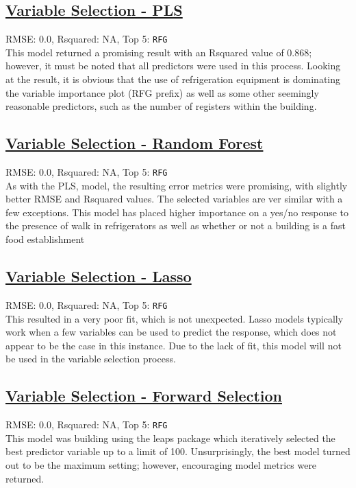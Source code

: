 \subsection{\hyperref[appendix:electricity:pls]{Variable Selection - PLS}}
RMSE: 0.0, Rsquared: NA, Top 5: \lstinline{RFG}
\\[0.0in]
\indent This model returned a promising result with an Rsquared value of 0.868; however, it must be noted that all predictors were used in this process.  Looking at the result, it is obvious that the use of refrigeration equipment is dominating the variable importance plot (RFG prefix) as well as some other seemingly reasonable predictors, such as the number of registers within the building.  

\subsection{\hyperref[appendix:electricity:rf]{Variable Selection - Random Forest}}
RMSE: 0.0, Rsquared: NA, Top 5: \lstinline{RFG}
\\[0.0in]
\indent As with the PLS, model, the resulting error metrics were promising, with slightly better RMSE and Rsquared values.  The selected variables are ver similar with a few exceptions.  This model has placed higher importance on a yes/no response to the presence of walk in refrigerators as well as whether or not a building is a fast food establishment

\subsection{\hyperref[appendix:electricity:l]{Variable Selection - Lasso}}
RMSE: 0.0, Rsquared: NA, Top 5: \lstinline{RFG}
\\[0.0in]
\indent This resulted in a very poor fit, which is not unexpected.  Lasso models typically work when a few variables can be used to predict the response, which does not appear to be the case in this instance.  Due to the lack of fit, this model will not be used in the variable selection process.

\subsection{\hyperref[appendix:electricity:lp]{Variable Selection - Forward Selection}}
RMSE: 0.0, Rsquared: NA, Top 5: \lstinline{RFG}
\\[0.0in]
\indent This model was building using the leaps package which iteratively selected the best predictor variable up to a limit of 100.  Unsurprisingly, the best model turned out to be the maximum setting; however, encouraging model metrics were returned.

